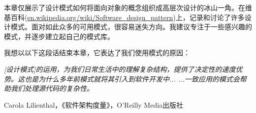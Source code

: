 

本章仅展示了设计模式如何将面向对象的概念组织成高层次设计的冰山一角。在维基百科(\url{en.wikipedia.org/wiki/Software_design_pattern})上，记录和讨论了许多设计模式。面对如此众多的可用模式，很容易迷失方向。我建议专注于一些感兴趣的模式，并逐步建立起自己的模式库。

我想以以下这段话结束本章，它表达了我们使用模式的原因：

\textit{
[设计模式]的运用，为我们日常生活中的理解复杂结构，提供了决定性的速度优势。这也是为什么多年前模式就将其引入到软件开发中... ...一致应用的模式会帮助我们处理源代码的复杂性。
}

\begin{flushright}
Carola Lilienthal，《软件架构度量》，O'Reilly Media出版社
\end{flushright}